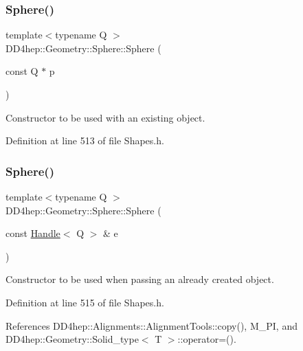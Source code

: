 \subsubsection{\texorpdfstring{Sphere()}{Sphere()}\hspace{0.1cm}{\footnotesize\ttfamily [3/5]}}
{\footnotesize\ttfamily template$<$typename Q $>$ \\
D\+D4hep\+::\+Geometry\+::\+Sphere\+::\+Sphere (\begin{DoxyParamCaption}\item[{const Q $\ast$}]{p }\end{DoxyParamCaption})\hspace{0.3cm}{\ttfamily [inline]}}



Constructor to be used with an existing object. 



Definition at line 513 of file Shapes.\+h.

\hypertarget{class_d_d4hep_1_1_geometry_1_1_sphere_a35289c31b9f8487486169efa6fd37a8f}{}\label{class_d_d4hep_1_1_geometry_1_1_sphere_a35289c31b9f8487486169efa6fd37a8f} 
\subsubsection{\texorpdfstring{Sphere()}{Sphere()}\hspace{0.1cm}{\footnotesize\ttfamily [4/5]}}
{\footnotesize\ttfamily template$<$typename Q $>$ \\
D\+D4hep\+::\+Geometry\+::\+Sphere\+::\+Sphere (\begin{DoxyParamCaption}\item[{const \hyperlink{class_d_d4hep_1_1_handle}{Handle}$<$ Q $>$ \&}]{e }\end{DoxyParamCaption})\hspace{0.3cm}{\ttfamily [inline]}}



Constructor to be used when passing an already created object. 



Definition at line 515 of file Shapes.\+h.



References D\+D4hep\+::\+Alignments\+::\+Alignment\+Tools\+::copy(), M\+\_\+\+PI, and D\+D4hep\+::\+Geometry\+::\+Solid\+\_\+type$<$ T $>$\+::operator=().

